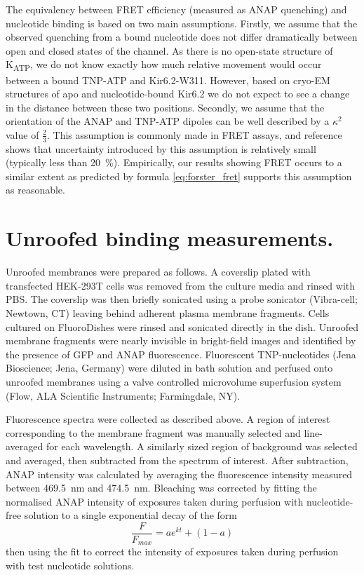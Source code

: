 The equivalency between FRET efficiency (measured as ANAP quenching) and nucleotide binding is based on two main assumptions.
Firstly, we assume that the observed quenching from a bound nucleotide does not differ dramatically between open and closed states of the channel.
As there is no open-state structure of K\textsubscript{ATP}, we do not know exactly how much relative movement would occur between a bound TNP-ATP and Kir6.2-W311.
However, based on cryo-EM structures of apo and nucleotide-bound Kir6.2 we do not expect to see a change in the distance between these two positions.
Secondly, we assume that the orientation of the ANAP and TNP-ATP dipoles can be well described by a $\kappa^2$ value of $\frac{2}{3}$.
This assumption is commonly made in FRET assays, and reference \cite{stryer_fluorescence_1978} shows that uncertainty introduced by this assumption is relatively small (typically less than \SI{20}{\percent}). Empirically, our results showing FRET occurs to a similar extent as predicted by formula \ref{eq:forster_fret} supports this assumption as reasonable.

\section{Unroofed binding measurements.}
Unroofed membranes were prepared as follows.
A coverslip plated with transfected HEK-293T cells was removed from the culture media and rinsed with PBS.
The coverslip was then briefly sonicated using a probe sonicator (Vibra-cell; Newtown, CT) leaving behind adherent plasma membrane fragments.
Cells cultured on FluoroDishes were rinsed and sonicated directly in the dish.
Unroofed membrane fragments were nearly invisible in bright-field images and identified by the presence of GFP and ANAP fluorescence.
Fluorescent TNP-nucleotides (Jena Bioscience; Jena, Germany) were diluted in bath solution and perfused onto unroofed membranes using a valve controlled microvolume superfusion system (\si{\micro}Flow, ALA Scientific Instruments; Farmingdale, NY).

Fluorescence spectra were collected as described above.
A region of interest corresponding to the membrane fragment was manually selected and line-averaged for each wavelength.
A similarly sized region of background was selected and averaged, then subtracted from the spectrum of interest.
After subtraction, ANAP intensity was calculated by averaging the fluorescence intensity measured between \SI{469.5}{\nano\metre} and \SI{474.5}{\nano\metre}.
Bleaching was corrected by fitting the normalised ANAP intensity of exposures taken during perfusion with nucleotide-free solution to a single exponential decay of the form
\begin{equation} \label{eq:bleaching}
    \frac{F}{F_{max}} = ae^{kt} + (1 - a)
\end{equation}
then using the fit to correct the intensity of exposures taken during perfusion with test nucleotide solutions.

